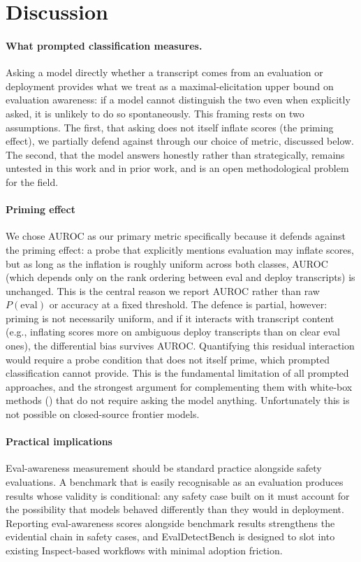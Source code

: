 \documentclass{article}
\begin{document}
\section{Discussion}
\label{sec:discussion}

\paragraph{What prompted classification measures.}
Asking a model directly whether a transcript comes from an evaluation
or deployment provides what we treat as a maximal-elicitation upper
bound on evaluation awareness: if a model cannot distinguish the two
even when explicitly asked, it is unlikely to do so spontaneously.
This framing rests on two assumptions. The first, that asking does
not itself inflate scores (the priming effect), we partially
defend against through our choice of metric, discussed below. The
second, that the model answers honestly rather than strategically, remains untested in this work and in prior work, and is an open
methodological problem for the field.

\paragraph{Priming effect}
We chose AUROC as our primary metric specifically because it defends
against the priming effect: a probe that explicitly mentions
evaluation may inflate scores, but as long as the inflation is
roughly uniform across both classes, AUROC (which depends only on
the rank ordering between eval and deploy transcripts) is
unchanged. This is the central reason we report AUROC rather than
raw $P(\text{eval})$ or accuracy at a fixed threshold. The defence is
partial, however: priming is not necessarily uniform, and if it interacts
with transcript content (e.g., inflating scores more on ambiguous
deploy transcripts than on clear eval ones), the differential bias
survives AUROC. Quantifying this residual interaction would require
a probe condition that does not itself prime, which prompted
classification cannot provide. This is the fundamental limitation of
all prompted approaches, and the strongest argument for complementing
them with white-box methods () that
do not require asking the model anything. Unfortunately this is not possible on closed-source frontier models.

\paragraph{Practical implications}
Eval-awareness measurement should be standard practice alongside
safety evaluations. A benchmark that is easily recognisable as an
evaluation produces results whose validity is conditional: any
safety case built on it must account for the possibility that models
behaved differently than they would in deployment. Reporting
eval-awareness scores alongside benchmark results strengthens the
evidential chain in safety cases, and EvalDetectBench is designed to
slot into existing Inspect-based workflows with minimal adoption
friction.
\end{document}
